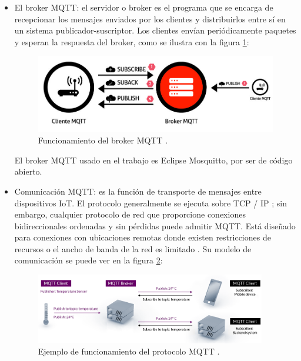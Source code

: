 \begin{itemize}
\item El broker MQTT: el servidor o broker es el programa que se encarga de recepcionar los mensajes enviados por los clientes y distribuirlos entre sí en un sistema publicador-suscriptor. Los clientes envían periódicamente paquetes y esperan la respuesta del broker, como se ilustra con la figura \ref{fig:broker}: 

\begin{figure}[htbp]
	\centering
	\includegraphics[width=.8\textwidth]{./Figures/broker.jpg}
	\caption{Funcionamiento del broker MQTT \protect\footnotemark.}

	\label{fig:broker}
\end{figure}


El broker MQTT usado en el trabajo es Eclipse Mosquitto, por ser de código abierto.

\item Comunicación MQTT: es la función de transporte de mensajes entre dispositivos IoT. El protocolo generalmente se ejecuta sobre TCP / IP ; sin embargo, cualquier protocolo de red que proporcione conexiones bidireccionales ordenadas y sin pérdidas puede admitir MQTT. Está diseñado para conexiones con ubicaciones remotas donde existen restricciones de recursos o el ancho de banda de la red es limitado \citep{WEBSITE:3}. Su modelo de comunicación se puede ver en la figura \ref{fig:mqtt}:

\vspace{0.5cm}

\begin{figure}[htbp]
	\centering
	\includegraphics[width=0.95\textwidth]{./Figures/mqtt.png}
	\caption{Ejemplo de funcionamiento del protocolo MQTT \protect\footnotemark.}
	\label{fig:mqtt}
\end{figure}


\end{itemize}

